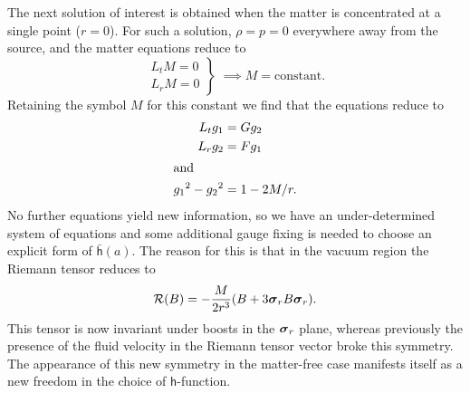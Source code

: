 \documentclass[a4paper]{article}
\numberwithin{equation}{section}
\newcommand{\barr}{\begin{array}}
\newcommand{\earr}{\end{array}}
\newcommand{\sig}{\mbox{\boldmath $\sigma$}}
\newcommand{\bsig}{\mbox{\boldmath $\sig$}}
\newcommand{\clr}{{\mathcal{R}}}
\newcommand{\sigr}{\bsig_r}
\newcommand{\lih}{\mathsf{h}}
\newcommand{\lbh}{\bar{\mathsf{h}}}
\newcommand{\ho}{\lbh}
\begin{document}
The next solution of interest is obtained when the matter is
concentrated at a single point ($r=0$).  For such a solution,
$\rho=p=0$ everywhere away from the source, and the matter equations
reduce to
%
\begin{equation}
\left. \barr{l}
L_t M = 0 \\ L_r M = 0
\earr \right\}  \; 
\implies M = \mbox{constant}.
\label{bh-Mconst}
\end{equation}
%
Retaining the symbol $M$ for this constant we find that the equations
reduce to
%
\begin{align}
L_t g_1 &= G g_2 \\ 
L_r g_2 &= F g_1 \\
\intertext{and}
{g_1}^2 - {g_2}^2 &= 1- 2M/r.
\end{align}
%
No further equations yield new information, so we have an
under-determined system of equations and some additional gauge fixing
is needed to choose an explicit form of $\ho(a)$.  The reason for this
is that in the vacuum region the Riemann tensor reduces to
%
\begin{equation}
\clr(B) = - \frac{M}{2 r^3} (B + 3 \sigr B \sigr).
\label{SS-swzR}
\end{equation}
%
This tensor is now invariant under boosts in the $\sigr$ plane,
whereas previously the presence of the fluid velocity in the Riemann
tensor vector broke this symmetry.  The appearance of this new
symmetry in the matter-free case manifests itself as a new freedom in
the choice of $\lih$-function.
\end{document}
